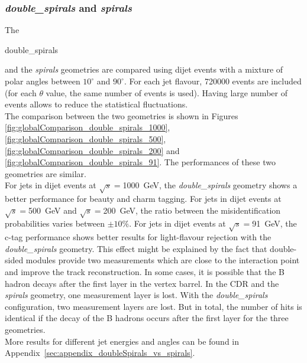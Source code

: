 \subsubsection{\emph{double\_spirals} and \emph{spirals}}

The \begin{it}double\_spirals\end{it} and the \textit{spirals} geometries are compared using dijet events with a mixture of polar angles between $10^{\circ}$ and $90^{\circ}$. For each jet flavour, 720000 events are included (for each $\theta$ value, the same number of events is used). Having large number of events allows to reduce the statistical fluctuations.\\
The comparison between the two geometries is shown in Figures \ref{fig:globalComparison_double_spirals_1000}, \ref{fig:globalComparison_double_spirals_500}, \ref{fig:globalComparison_double_spirals_200} and \ref{fig:globalComparison_double_spirals_91}. The performances of these two geometries are similar.\\ 
For jets in dijet events at $\sqrt{s}=$1000~GeV, the \textit{double\_spirals} geometry shows a better performance for beauty and charm tagging. For jets in dijet events at $\sqrt{s}=$500~GeV and $\sqrt{s}=$200~GeV, the ratio between the misidentification probabilities varies between $\pm 10\%$. For jets in dijet events at $\sqrt{s}=$91~GeV, the c-tag performance shows better results for light-flavour rejection with the \textit{double\_spirals} geometry. This effect might be explained by the fact that double-sided modules provide two measurements which are close to the interaction point and improve the track reconstruction. In some cases, it is possible that the B hadron decays after the first layer in the vertex barrel. In the CDR and the \textit{spirals} geometry, one measurement layer is lost. With the \textit{double\_spirals} configuration, two measurement layers are lost. But in total, the number of hits is identical if the decay of the B hadrons occurs after the first layer for the three geometries.\\
More results for different jet energies and angles can be found in Appendix~\ref{sec:appendix_doubleSpirals_vs_spirals}.


